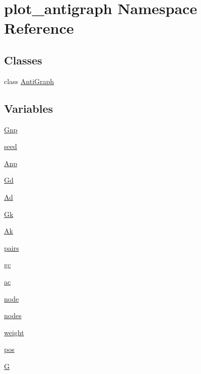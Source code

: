 \hypertarget{namespaceplot__antigraph}{}\section{plot\+\_\+antigraph Namespace Reference}
\label{namespaceplot__antigraph}
\subsection*{Classes}
\begin{DoxyCompactItemize}
\item 
class \hyperlink{classplot__antigraph_1_1AntiGraph}{Anti\+Graph}
\end{DoxyCompactItemize}
\subsection*{Variables}
\begin{DoxyCompactItemize}
\item 
\hyperlink{namespaceplot__antigraph_a094f665839482bfeb9eaf2b16b3a62f5}{Gnp}
\item 
\hyperlink{namespaceplot__antigraph_a3306e8667c665afc1a2350b635f40b5e}{seed}
\item 
\hyperlink{namespaceplot__antigraph_abf8d7b826ce58936bd2fdf0dcf5ce3c9}{Anp}
\item 
\hyperlink{namespaceplot__antigraph_a9eecd18a383be59a472393dd15b80398}{Gd}
\item 
\hyperlink{namespaceplot__antigraph_a3fae53e8a70927189f658f99012c93c5}{Ad}
\item 
\hyperlink{namespaceplot__antigraph_ac9ed6da0bca909de00b886b62ab97535}{Gk}
\item 
\hyperlink{namespaceplot__antigraph_a22f627b032b618bd3a5fab0e42c0fa5b}{Ak}
\item 
\hyperlink{namespaceplot__antigraph_a822d0e5328b36aee4440afad3e707774}{pairs}
\item 
\hyperlink{namespaceplot__antigraph_ae93d6b1c7a7a83a53fe0e84e7819be84}{gc}
\item 
\hyperlink{namespaceplot__antigraph_a5fd9c099e35e5ea1fac4e9ebff5f4f1e}{ac}
\item 
\hyperlink{namespaceplot__antigraph_a4f34aafafba7ed56a30859da54870be3}{node}
\item 
\hyperlink{namespaceplot__antigraph_ae6209c117761fa34b013ff84d9d657e9}{nodes}
\item 
\hyperlink{namespaceplot__antigraph_a3e303333b2262260b3826f0f339c5510}{weight}
\item 
\hyperlink{namespaceplot__antigraph_a46baa092ad766b818facc5c077509eb7}{pos}
\item 
\hyperlink{namespaceplot__antigraph_a7cdef3f4a58200d5e1c8b0426eabc7cf}{G}
\end{DoxyCompactItemize}


